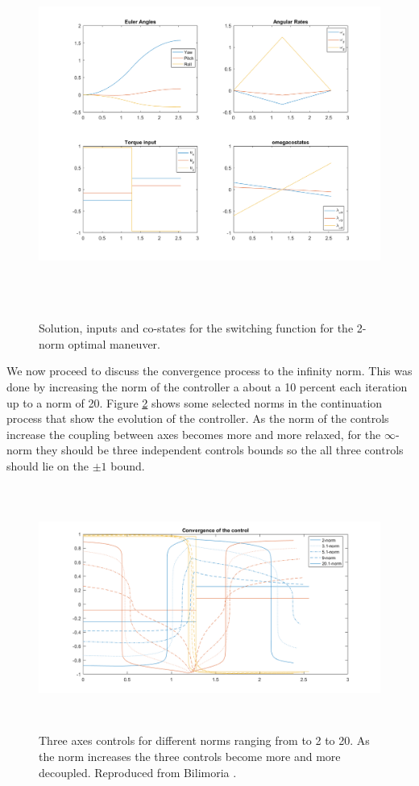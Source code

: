 \begin{figure}[h]
	\centering
	\includegraphics[height=12cm,keepaspectratio]{media/l2Maneuver.png}
	\caption{Solution, inputs and co-states for the switching function for the 2-norm optimal maneuver.}
	\label{fig:l2Maneuver}
\end{figure}

We now proceed to discuss the convergence process to the infinity norm. This was done by increasing the norm of the controller a about a 10 percent each iteration up to a norm of 20. Figure \ref{fig:lConvergence} shows some selected norms in the continuation process that show the evolution of the controller. As the norm of the controls increase the coupling between axes becomes more and more relaxed, for the $\infty$-norm they should be three independent controls bounds so the all three controls should lie on the $\pm1$ bound.

\begin{figure}
	\centering
	\includegraphics[height=8cm,keepaspectratio]{media/controlConvergence.png}
	\caption{Three axes controls for different norms ranging from to 2 to 20. As the norm increases the three controls become more and more decoupled. Reproduced from Bilimoria \cite{bilimoria1993time}.}
	\label{fig:lConvergence}
\end{figure}

